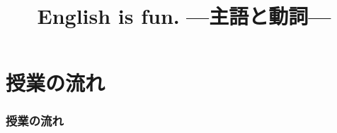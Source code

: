 \documentclass[aspectratio=169,xcolor={dvipsnames,table}]{beamer}
\title{English is fun.\,\,{}---主語と動詞---}
\author{}
\institute[]{}
\date[]
\begin{document}
%
%
%
%
%
%
\begin{frame}[plain,label=title]
  \titlepage
\end{frame}
%
%
%
%
%
%
%
\section*{授業の流れ}
\begin{frame}[plain]
  \frametitle{授業の流れ}
  \tableofcontents
\end{frame}
\end{document}
